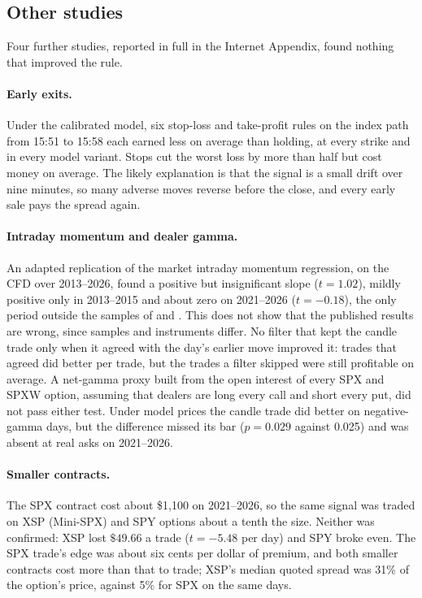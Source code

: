 \documentclass[12pt,letterpaper]{article}
\begin{document}
\subsection{Other studies}
\label{sec:other}

Four further studies, reported in full in the Internet Appendix, found nothing
that improved the rule.

\paragraph{Early exits.} Under the calibrated model, six stop-loss and
take-profit rules on the index path from 15:51 to 15:58 each earned less on
average than holding, at every strike and in every model variant. Stops cut the
worst loss by more than half but cost money on average. The likely explanation is that the signal is a small drift over nine minutes,
so many adverse moves reverse before the close, and every early sale pays the
spread again.

\paragraph{Intraday momentum and dealer gamma.} An adapted replication of the
market intraday momentum regression, on the CFD over 2013--2026, found a positive
but insignificant slope ($t = 1.02$), mildly positive only in 2013--2015 and about
zero on 2021--2026 ($t = -0.18$), the only period outside the samples of
\citet{ghlz2018} and \citet{bdlm2021}. This does not show that the published
results are wrong, since samples and instruments differ. No filter that kept the
candle trade only when it agreed with the day's earlier move improved it: trades
that agreed did better per trade, but the trades a filter skipped were still
profitable on average. A net-gamma proxy built from the open interest of every
SPX and SPXW option, assuming that dealers are long every call and short every
put, did not pass either test. Under model prices the candle trade did better on
negative-gamma days, but the difference missed its bar ($p = 0.029$ against
0.025) and was absent at real asks on 2021--2026.

\paragraph{Smaller contracts.} The SPX contract cost about \$1{,}100 on
2021--2026, so the same signal was traded on XSP (Mini-SPX) and SPY options about
a tenth the size. Neither was confirmed: XSP lost $\$49.66$ a trade ($t = -5.48$
per day) and SPY broke even. The SPX trade's edge was about six cents per dollar
of premium, and both smaller contracts cost more than that to trade; XSP's median
quoted spread was 31\% of the option's price, against 5\% for SPX on the same
days.
\end{document}
